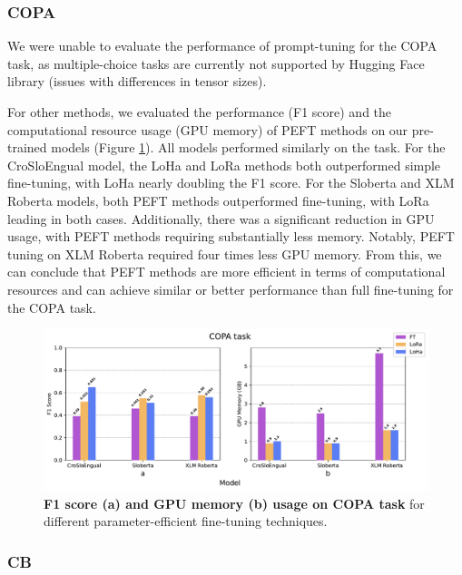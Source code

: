 \documentclass[fleqn,moreauthors,10pt]{ds_report}
\begin{document}
\subsubsection*{COPA}

We were unable to evaluate the performance of prompt-tuning for the COPA task, as multiple-choice tasks are currently not supported by Hugging Face library (issues with differences in tensor sizes).

For other methods, we evaluated the performance (F1 score) and the computational resource usage (GPU memory) of PEFT methods on our pre-trained models (Figure \ref{fig:copa_scores}). All models performed similarly on the task. For the CroSloEngual model, the LoHa and LoRa methods both outperformed simple fine-tuning, with LoHa nearly doubling the F1 score. For the Sloberta and XLM Roberta models, both PEFT methods outperformed fine-tuning, with LoRa leading in both cases. Additionally, there was a significant reduction in GPU usage, with PEFT methods requiring substantially less memory. Notably, PEFT tuning on XLM Roberta required four times less GPU memory. From this, we can conclude that PEFT methods are more efficient in terms of computational resources and can achieve similar or better performance than full fine-tuning for the COPA task. 

\begin{figure}[ht]\centering
	\includegraphics[width=\linewidth]{results/superglue/COPA.pdf}
	\caption{\textbf{F1 score (a) and GPU memory (b) usage on COPA task} for different parameter-efficient fine-tuning techniques.}
	\label{fig:copa_scores}
\end{figure}

\subsubsection*{CB}
\end{document}
